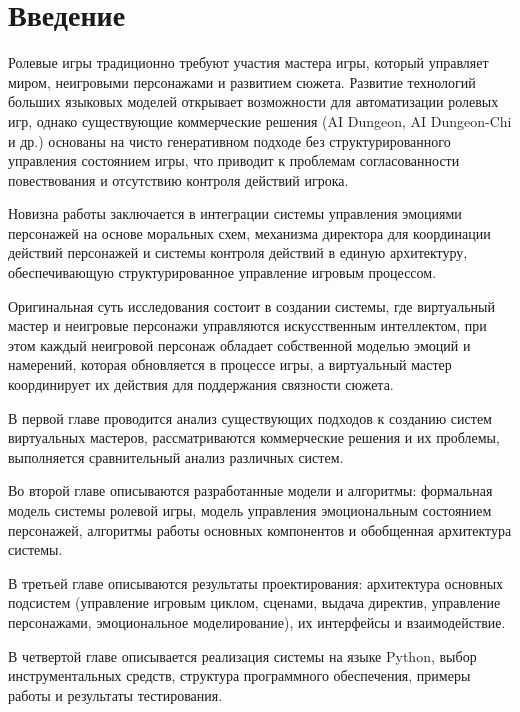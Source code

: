 \chapter*{Введение}
\label{sec:afterwords}

Ролевые игры традиционно требуют участия мастера игры, который управляет миром, неигровыми персонажами и развитием сюжета. Развитие технологий больших языковых моделей открывает возможности для автоматизации ролевых игр, однако существующие коммерческие решения (AI Dungeon, AI Dungeon-Chi и др.) основаны на чисто генеративном подходе без структурированного управления состоянием игры, что приводит к проблемам согласованности повествования и отсутствию контроля действий игрока.

Новизна работы заключается в интеграции системы управления эмоциями персонажей на основе моральных схем, механизма директора для координации действий персонажей и системы контроля действий в единую архитектуру, обеспечивающую структурированное управление игровым процессом.

Оригинальная суть исследования состоит в создании системы, где виртуальный мастер и неигровые персонажи управляются искусственным интеллектом, при этом каждый неигровой персонаж обладает собственной моделью эмоций и намерений, которая обновляется в процессе игры, а виртуальный мастер координирует их действия для поддержания связности сюжета.

В первой главе проводится анализ существующих подходов к созданию систем виртуальных мастеров, рассматриваются коммерческие решения и их проблемы, выполняется сравнительный анализ различных систем.

Во второй главе описываются разработанные модели и алгоритмы: формальная модель системы ролевой игры, модель управления эмоциональным состоянием персонажей, алгоритмы работы основных компонентов и обобщенная архитектура системы.

В третьей главе описываются результаты проектирования: архитектура основных подсистем (управление игровым циклом, сценами, выдача директив, управление персонажами, эмоциональное моделирование), их интерфейсы и взаимодействие.

В четвертой главе описывается реализация системы на языке Python, выбор инструментальных средств, структура программного обеспечения, примеры работы и результаты тестирования.



